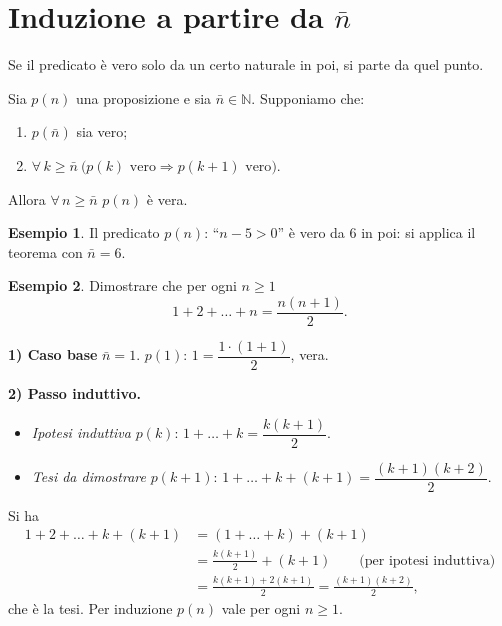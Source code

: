 \documentclass[11pt,a4paper]{article}
\theoremstyle{definition}
\newtheorem*{esempio}{Esempio}
\begin{document}
\section{Induzione a partire da $\bar n$}

Se il predicato è vero solo da un certo naturale in poi, si parte da
quel punto.

\begin{teorema}
Sia $p(n)$ una proposizione e sia $\bar n \in \mathbb{N}$. Supponiamo che:
\begin{enumerate}
    \item $p(\bar n)$ sia vero;
    \item $\forall\, k \geq \bar n \ \big(p(k) \text{ vero} \Rightarrow
          p(k+1) \text{ vero}\big)$.
\end{enumerate}
Allora $\forall\, n \geq \bar n$ $p(n)$ è vera.
\end{teorema}

\begin{esempio}
Il predicato $p(n)$: ``$n - 5 > 0$'' è vero da $6$ in poi: si applica il
teorema con $\bar n = 6$.
\end{esempio}

\begin{esempio}
Dimostrare che per ogni $n \geq 1$
\[
1 + 2 + \dots + n = \frac{n(n+1)}{2}. \tag*{$p(n)$}
\]

\textbf{1) Caso base} $\bar n = 1$. $p(1)$: $1 = \dfrac{1 \cdot (1+1)}{2}$,
vera.

\textbf{2) Passo induttivo.}
\begin{itemize}
    \item \emph{Ipotesi induttiva} $p(k)$:
          $1 + \dots + k = \dfrac{k(k+1)}{2}$.
    \item \emph{Tesi da dimostrare} $p(k+1)$:
          $1 + \dots + k + (k+1) = \dfrac{(k+1)(k+2)}{2}$.
\end{itemize}
Si ha
\begin{align*}
1 + 2 + \dots + k + (k+1) &= (1 + \dots + k) + (k+1)\\
&= \frac{k(k+1)}{2} + (k+1) \qquad \text{(per ipotesi induttiva)}\\
&= \frac{k(k+1) + 2(k+1)}{2} = \frac{(k+1)(k+2)}{2},
\end{align*}
che è la tesi. Per induzione $p(n)$ vale per ogni $n \geq 1$.
\end{esempio}
\end{document}
